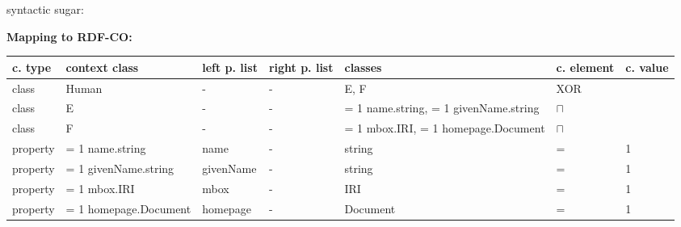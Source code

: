 \documentclass{llncs}
\newenvironment{gcotable}{
  \scriptsize
  \sffamily
  \vspace{0cm}
	\begin{center}
	\textbf{\vspace{0.4cm}Mapping to RDF-CO:} \\
  \begin{tabular}{l|l|l|l|l|l|l}
	\hline
  \textbf{c. type} & \textbf{context class} & \textbf{left p. list} & \textbf{right p. list} & \textbf{classes} & \textbf{c. element} & \textbf{c. value} \\
  \hline

}{
  \hline
  \end{tabular}
	\end{center}
}
\begin{document}
syntactic sugar:
\begin{gcotable}
class & Human & - & - & E, F & XOR \\
class & E & - & - & = 1 name.string, = 1 givenName.string & $\sqcap$ \\
class & F & - & - & = 1 mbox.IRI, = 1 homepage.Document & $\sqcap$ \\
property & = 1 name.string & name & - & string & = & 1 \\
property & = 1 givenName.string & givenName & - & string & = & 1 \\
property & = 1 mbox.IRI & mbox & - & IRI & = & 1 \\
property & = 1 homepage.Document & homepage & - & Document & = & 1 \\
\end{gcotable}

%
%
%
%
\end{document}
